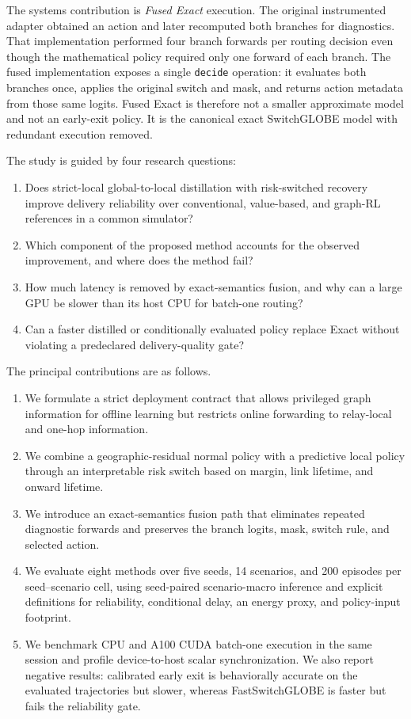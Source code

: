 \documentclass{ieeeaccess}
\newcommand{\SG}{SwitchGLOBE}
\newcommand{\FastSG}{FastSwitchGLOBE}
\begin{document}
The systems contribution is \emph{Fused Exact} execution. The original instrumented adapter obtained an action and later recomputed both branches for diagnostics. That implementation performed four branch forwards per routing decision even though the mathematical policy required only one forward of each branch. The fused implementation exposes a single \texttt{decide} operation: it evaluates both branches once, applies the original switch and mask, and returns action metadata from those same logits. Fused Exact is therefore not a smaller approximate model and not an early-exit policy. It is the canonical exact \SG{} model with redundant execution removed.

The study is guided by four research questions:
\begin{enumerate}[leftmargin=*]
\item Does strict-local global-to-local distillation with risk-switched recovery improve delivery reliability over conventional, value-based, and graph-RL references in a common simulator?
\item Which component of the proposed method accounts for the observed improvement, and where does the method fail?
\item How much latency is removed by exact-semantics fusion, and why can a large GPU be slower than its host CPU for batch-one routing?
\item Can a faster distilled or conditionally evaluated policy replace Exact without violating a predeclared delivery-quality gate?
\end{enumerate}

The principal contributions are as follows.
\begin{enumerate}[leftmargin=*]
\item We formulate a strict deployment contract that allows privileged graph information for offline learning but restricts online forwarding to relay-local and one-hop information.
\item We combine a geographic-residual normal policy with a predictive local policy through an interpretable risk switch based on margin, link lifetime, and onward lifetime.
\item We introduce an exact-semantics fusion path that eliminates repeated diagnostic forwards and preserves the branch logits, mask, switch rule, and selected action.
\item We evaluate eight methods over five seeds, 14 scenarios, and 200 episodes per seed--scenario cell, using seed-paired scenario-macro inference and explicit definitions for reliability, conditional delay, an energy proxy, and policy-input footprint.
\item We benchmark CPU and A100 CUDA batch-one execution in the same session and profile device-to-host scalar synchronization. We also report negative results: calibrated early exit is behaviorally accurate on the evaluated trajectories but slower, whereas \FastSG{} is faster but fails the reliability gate.
\end{enumerate}
\end{document}
